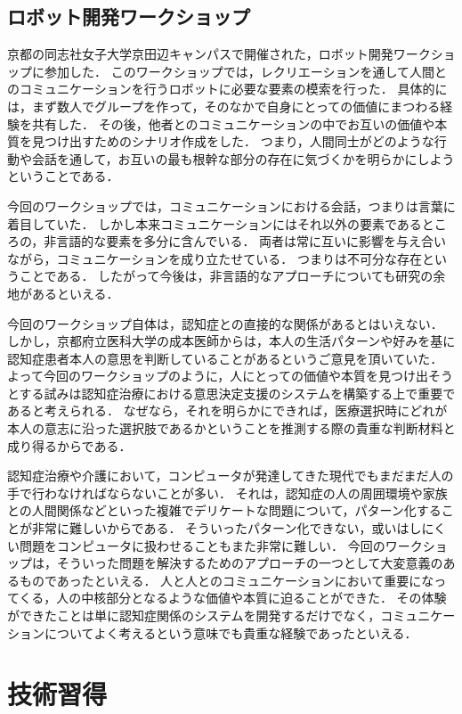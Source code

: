 \documentclass[../report]{subfiles}
\begin{document}
\subsection{ロボット開発ワークショップ}
京都の同志社女子大学京田辺キャンパスで開催された，ロボット開発ワークショップに参加した．
このワークショップでは，レクリエーションを通して人間とのコミュニケーションを行うロボットに必要な要素の模索を行った．
具体的には，まず数人でグループを作って，そのなかで自身にとっての価値にまつわる経験を共有した．
その後，他者とのコミュニケーションの中でお互いの価値や本質を見つけ出すためのシナリオ作成をした．
つまり，人間同士がどのような行動や会話を通して，お互いの最も根幹な部分の存在に気づくかを明らかにしようということである．

今回のワークショップでは，コミュニケーションにおける会話，つまりは言葉に着目していた．
しかし本来コミュニケーションにはそれ以外の要素であるところの，非言語的な要素を多分に含んでいる．
両者は常に互いに影響を与え合いながら，コミュニケーションを成り立たせている．
つまりは不可分な存在ということである．
したがって今後は，非言語的なアプローチについても研究の余地があるといえる．

今回のワークショップ自体は，認知症との直接的な関係があるとはいえない．
しかし，京都府立医科大学の成本医師からは，本人の生活パターンや好みを基に認知症患者本人の意思を判断していることがあるというご意見を頂いていた．
よって今回のワークショップのように，人にとっての価値や本質を見つけ出そうとする試みは認知症治療における意思決定支援のシステムを構築する上で重要であると考えられる．
なぜなら，それを明らかにできれば，医療選択時にどれが本人の意志に沿った選択肢であるかということを推測する際の貴重な判断材料と成り得るからである．

認知症治療や介護において，コンピュータが発達してきた現代でもまだまだ人の手で行わなければならないことが多い．
それは，認知症の人の周囲環境や家族との人間関係などといった複雑でデリケートな問題について，パターン化することが非常に難しいからである．
そういったパターン化できない，或いはしにくい問題をコンピュータに扱わせることもまた非常に難しい．
今回のワークショップは，そういった問題を解決するためのアプローチの一つとして大変意義のあるものであったといえる．
人と人とのコミュニケーションにおいて重要になってくる，人の中核部分となるような価値や本質に迫ることができた．
その体験ができたことは単に認知症関係のシステムを開発するだけでなく，コミュニケーションについてよく考えるという意味でも貴重な経験であったといえる．


\section{技術習得}
\end{document}
